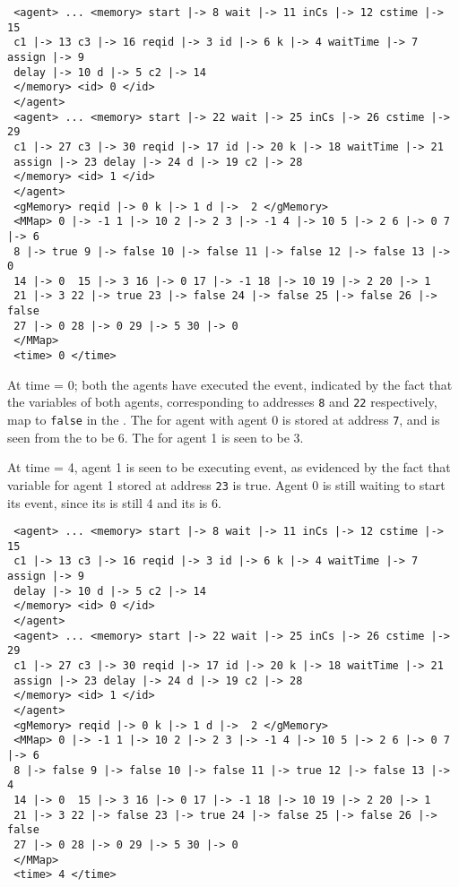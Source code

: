 \begin{verbatim}
 <agent> ... <memory> start |-> 8 wait |-> 11 inCs |-> 12 cstime |-> 15 
 c1 |-> 13 c3 |-> 16 reqid |-> 3 id |-> 6 k |-> 4 waitTime |-> 7 assign |-> 9
 delay |-> 10 d |-> 5 c2 |-> 14 
 </memory> <id> 0 </id> 
 </agent> 
 <agent> ... <memory> start |-> 22 wait |-> 25 inCs |-> 26 cstime |-> 29
 c1 |-> 27 c3 |-> 30 reqid |-> 17 id |-> 20 k |-> 18 waitTime |-> 21 
 assign |-> 23 delay |-> 24 d |-> 19 c2 |-> 28 
 </memory> <id> 1 </id> 
 </agent>
 <gMemory> reqid |-> 0 k |-> 1 d |->  2 </gMemory>
 <MMap> 0 |-> -1 1 |-> 10 2 |-> 2 3 |-> -1 4 |-> 10 5 |-> 2 6 |-> 0 7 |-> 6
 8 |-> true 9 |-> false 10 |-> false 11 |-> false 12 |-> false 13 |-> 0
 14 |-> 0  15 |-> 3 16 |-> 0 17 |-> -1 18 |-> 10 19 |-> 2 20 |-> 1 
 21 |-> 3 22 |-> true 23 |-> false 24 |-> false 25 |-> false 26 |-> false
 27 |-> 0 28 |-> 0 29 |-> 5 30 |-> 0 
 </MMap>
 <time> 0 </time>
\end{verbatim}


At time = 0; both the agents have executed the  event, indicated by the fact that the  variables of both agents, corresponding to addresses \verb|8| and \verb|22| respectively, map to \verb|false| in the . The  for agent with agent 0 is stored at address \verb|7|, and is seen from the  to be 6. The  for agent 1 is seen to be 3.   

At time = 4, agent 1 is seen to be executing  event, as evidenced by the fact that variable  for agent 1 stored at address \verb|23| is true. Agent 0 is still waiting to start its  event, since its  is still 4 and its  is 6.  
\begin{verbatim}
 <agent> ... <memory> start |-> 8 wait |-> 11 inCs |-> 12 cstime |-> 15 
 c1 |-> 13 c3 |-> 16 reqid |-> 3 id |-> 6 k |-> 4 waitTime |-> 7 assign |-> 9
 delay |-> 10 d |-> 5 c2 |-> 14 
 </memory> <id> 0 </id> 
 </agent> 
 <agent> ... <memory> start |-> 22 wait |-> 25 inCs |-> 26 cstime |-> 29
 c1 |-> 27 c3 |-> 30 reqid |-> 17 id |-> 20 k |-> 18 waitTime |-> 21 
 assign |-> 23 delay |-> 24 d |-> 19 c2 |-> 28 
 </memory> <id> 1 </id> 
 </agent>
 <gMemory> reqid |-> 0 k |-> 1 d |->  2 </gMemory>
 <MMap> 0 |-> -1 1 |-> 10 2 |-> 2 3 |-> -1 4 |-> 10 5 |-> 2 6 |-> 0 7 |-> 6
 8 |-> false 9 |-> false 10 |-> false 11 |-> true 12 |-> false 13 |-> 4
 14 |-> 0  15 |-> 3 16 |-> 0 17 |-> -1 18 |-> 10 19 |-> 2 20 |-> 1 
 21 |-> 3 22 |-> false 23 |-> true 24 |-> false 25 |-> false 26 |-> false
 27 |-> 0 28 |-> 0 29 |-> 5 30 |-> 0 
 </MMap>
 <time> 4 </time>
\end{verbatim}


